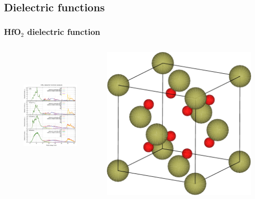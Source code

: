 \documentclass{beamer}
\begin{document}
\subsection{Dielectric functions}
\begin{frame}
    \frametitle{HfO$_2$ dielectric function}

	\begin{columns}[c]
	\vspace{-0.5cm}

    \begin{figure}
	\includegraphics[height=6.8cm]{figures/cubic-eps.pdf}
	\end{figure}

	\includegraphics[width=0.75\linewidth]{figures/cubic.pdf}


\end{columns}
\end{frame}
\end{document}
